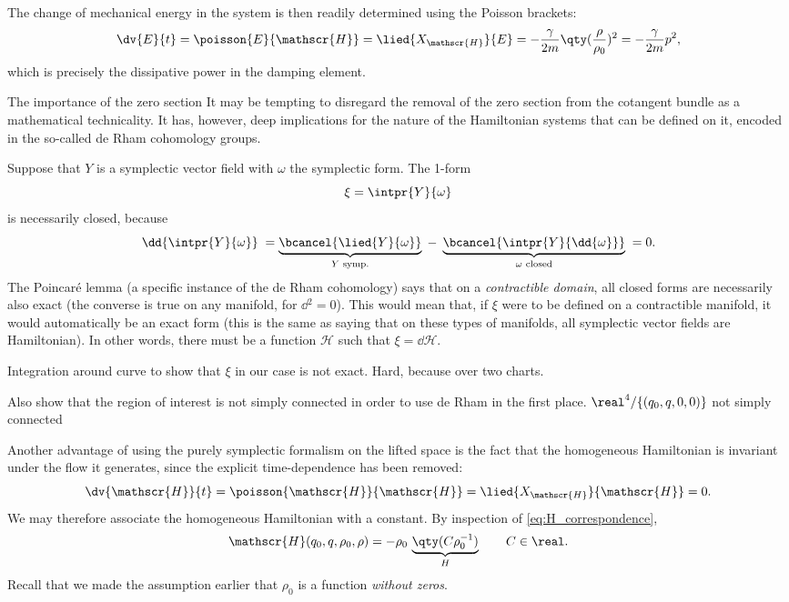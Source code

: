 The change of mechanical energy in the system is then readily determined using the Poisson brackets:
$$ \dv{E}{t} = \poisson{E}{\mathscr{H}} = \lied{X_\mathscr{H}}{E} = -\frac{\gamma}{2m}\qty(\frac{\rho}{\rho_0})^2 = -\frac{\gamma}{2m}p^2,$$
which is precisely the dissipative power in the damping element.


\begin{mathbox}{The importance of the zero section}
    It may be tempting to disregard the removal of the zero section from the cotangent bundle as a mathematical technicality. It has, however, deep implications for the nature of the Hamiltonian systems that can be defined on it, encoded in the so-called de Rham cohomology groups.
    
    Suppose that $Y$ is a symplectic vector field with $\omega$ the symplectic form. The 1-form
    $$\xi = \intpr{Y}{\omega}$$
    is necessarily closed, because
    $$ \dd{\intpr{Y}{\omega}} \; = \underbrace{\bcancel{\lied{Y}{\omega}}}_{Y \text{ symp.}}\;- \; \underbrace{\bcancel{\intpr{Y}{\dd{\omega}}}}_{\omega \text{ closed}}\; = 0. $$
    The Poincaré lemma (a specific instance of the de Rham cohomology) says that on a \emph{contractible domain}, all closed forms are necessarily also exact (the converse is true on any manifold, for $\dd{}^2 = 0$). This would mean that, if $\xi$ were to be defined on a contractible manifold, it would automatically be an exact form (this is the same as saying that on these types of manifolds, all symplectic vector fields are Hamiltonian). In other words, there must be a function $\mathscr{H}$ such that $\xi = \dd{\mathscr{H}}$.

    Integration around curve to show that $\xi$ in our case is not exact. Hard, because over two charts.

    Also show that the region of interest is not simply connected in order to use de Rham in the first place.
    $ \real^4 / \{(q_0, q, 0, 0)\} $ not simply connected
\end{mathbox}

Another advantage of using the purely symplectic formalism on the lifted space is the fact that the homogeneous Hamiltonian is invariant under the flow it generates, since the explicit time-dependence has been removed:
$$ \dv{\mathscr{H}}{t} = \poisson{\mathscr{H}}{\mathscr{H}} = \lied{X_{\mathscr{H}}}{\mathscr{H}} = 0. $$
We may therefore associate the homogeneous Hamiltonian with a constant. By inspection of \cref{eq:H_correspondence}, 
$$ \mathscr{H}(q_0, q, \rho_0, \rho) = -\rho_0\,\underbrace{\qty(C\rho_0^{-1})}_{H} \qquad C \in \real.$$
Recall that we made the assumption earlier that $\rho_0$ is a function \emph{without zeros}. 

